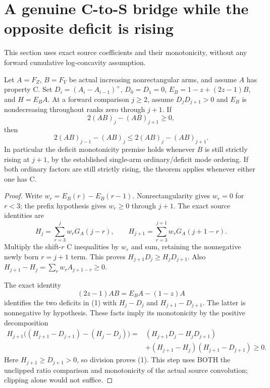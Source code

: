 \section{A genuine C-to-S bridge while the opposite deficit is rising}
This section uses exact source coefficients and their monotonicity,
without any forward cumulative log-concavity assumption.

\begin{theorem}
Let $A=F_Z$, $B=F_Y$ be actual increasing nonrectangular arms, and
assume $A$ has property C. Set $D_i=(A_i-A_{i-1})^+$,
$D_0=D_1=0$, $E_B=1-z+(2z-1)B$, and $H=E_BA$.
At a forward comparison $j\ge2$, assume
$D_jD_{j+1}>0$ and $E_B$ is nondecreasing throughout ranks
zero through $j+1$. If
\[
                    2(AB)_j-(AB)_{j+1}\ge0,
\]
then
\[
            2(AB)_{j-1}-(AB)_j
                       \le2(AB)_j-(AB)_{j+1}.           \tag{1}
\]
In particular the deficit monotonicity premise holds whenever $B$
is still strictly rising at $j+1$, by the established single-arm
ordinary/deficit mode ordering. If both ordinary factors are still
strictly rising, the theorem applies whenever either one has C.
\end{theorem}
\begin{proof}
Write $w_r=E_B(r)-E_B(r-1)$. Nonrectangularity gives $w_r=0$
for $r<3$; the prefix hypothesis gives $w_r\ge0$ through $j+1$.
The exact source identities are
\[
 H_j=\sum_{r=3}^j w_rG_A(j-r),\qquad
 H_{j+1}=\sum_{r=3}^{j+1}w_rG_A(j+1-r).
\]
Multiply the shift-$r$ C inequalities by $w_r$ and sum, retaining
the nonnegative newly born $r=j+1$ term. This proves
$H_{j+1}D_j\ge H_jD_{j+1}$. Also
$H_{j+1}-H_j=\sum_rw_rA_{j+1-r}\ge0$.

The exact identity
\[
                    (2z-1)AB=E_BA-(1-z)A
\]
identifies the two deficits in (1) with $H_j-D_j$ and
$H_{j+1}-D_{j+1}$. The latter is nonnegative by hypothesis.
These facts imply its monotonicity by the positive decomposition
\[
\begin{split}
 H_{j+1}\bigl((H_{j+1}-D_{j+1})-(H_j-D_j)\bigr)
  ={}&(H_{j+1}D_j-H_jD_{j+1})\\
    &+(H_{j+1}-H_j)(H_{j+1}-D_{j+1})\ge0.
\end{split}
\]
Here $H_{j+1}\ge D_{j+1}>0$, so division proves (1).
This step uses BOTH the unclipped ratio comparison and monotonicity
of the actual source convolution; clipping alone would not suffice.
\end{proof}

